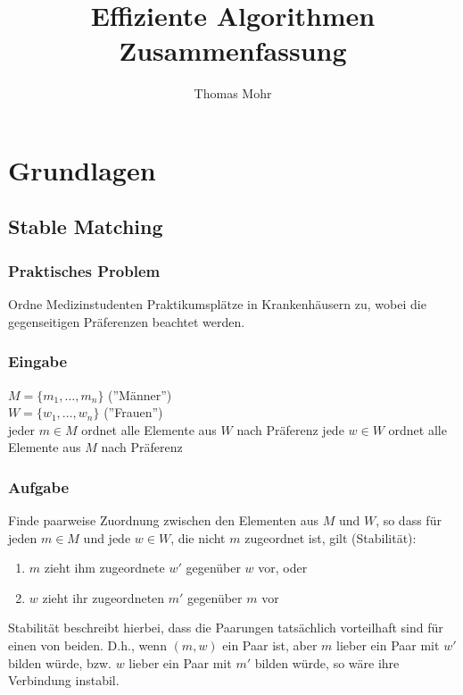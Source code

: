 \documentclass{scrartcl}
\title{Effiziente Algorithmen \\ Zusammenfassung}
\author{Thomas Mohr}
\date{}
\begin{document}
\maketitle
\pagebreak
\tableofcontents
\pagebreak
\listofalgorithms
\pagebreak

\section{Grundlagen}

\subsection{Stable Matching}

\subsubsection{Praktisches Problem}

Ordne Medizinstudenten Praktikumsplätze in Krankenhäusern zu, wobei die gegenseitigen Präferenzen beachtet werden.

\subsubsection{Eingabe}

$ M = \{ m_1,\ldots,m_n \} $ (''Männer'') \\
$ W = \{ w_1,\ldots,w_n \} $ (''Frauen'') \\
jeder $ m \in M $ ordnet alle Elemente aus $ W $ nach Präferenz
jede $ w \in W $ ordnet alle Elemente aus $ M $ nach Präferenz

\subsubsection{Aufgabe}

Finde paarweise Zuordnung zwischen den Elementen aus $ M $ und $ W $, so dass für jeden $ m \in M $ und jede $ w \in W $, die nicht $ m $ zugeordnet ist, gilt (Stabilität):
\begin{enumerate}
	\item $ m $ zieht ihm zugeordnete $ w' $ gegenüber $ w $ vor, oder
	\item $ w $ zieht ihr zugeordneten $ m' $ gegenüber $ m $ vor
\end{enumerate}
Stabilität beschreibt hierbei, dass die Paarungen tatsächlich vorteilhaft sind für einen von beiden. D.h., wenn $ (m,w) $ ein Paar ist, aber $ m $ lieber ein Paar mit $ w' $ bilden würde, bzw. $ w $ lieber ein Paar mit $ m' $ bilden würde, so wäre ihre Verbindung instabil.
\end{document}
